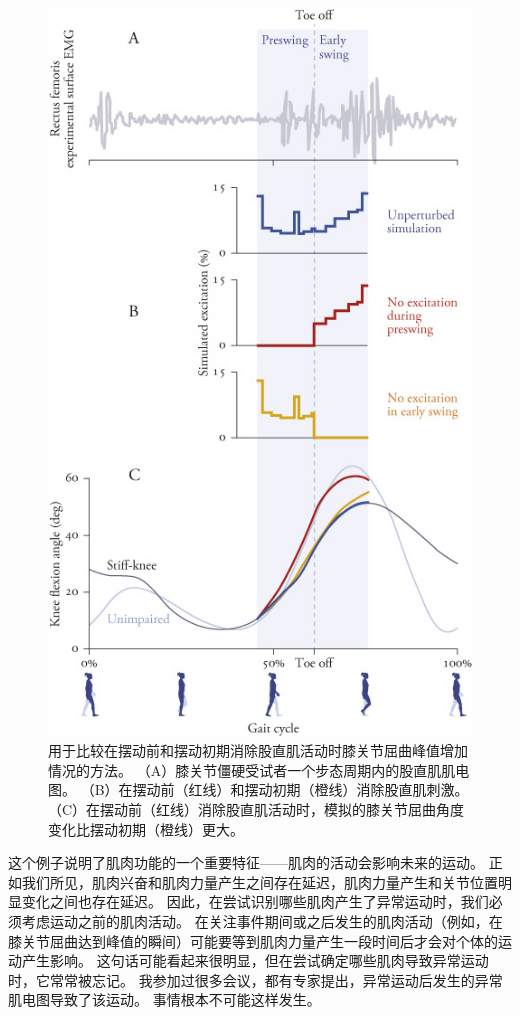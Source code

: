 \begin{figure}[!htb]
	\centering
	\includegraphics[width=0.75\linewidth]{chap11/11_6}
	\caption{用于比较在摆动前和摆动初期消除股直肌活动时膝关节屈曲峰值增加情况的方法。
		（A）膝关节僵硬受试者一个步态周期内的股直肌肌电图。
		（B）在摆动前（红线）和摆动初期（橙线）消除股直肌刺激。
		（C）在摆动前（红线）消除股直肌活动时，模拟的膝关节屈曲角度变化比摆动初期（橙线）更大\cite{reinbolt2008importance}。 \label{fig:11_6}}
\end{figure}


这个例子说明了肌肉功能的一个重要特征——肌肉的活动会影响未来的运动。
正如我们所见，肌肉兴奋和肌肉力量产生之间存在延迟，肌肉力量产生和关节位置明显变化之间也存在延迟。
因此，在尝试识别哪些肌肉产生了异常运动时，我们必须考虑运动之前的肌肉活动。
在关注事件期间或之后发生的肌肉活动（例如，在膝关节屈曲达到峰值的瞬间）可能要等到肌肉力量产生一段时间后才会对个体的运动产生影响。
这句话可能看起来很明显，但在尝试确定哪些肌肉导致异常运动时，它常常被忘记。
我参加过很多会议，都有专家提出，异常运动后发生的异常肌电图导致了该运动。
事情根本不可能这样发生。


